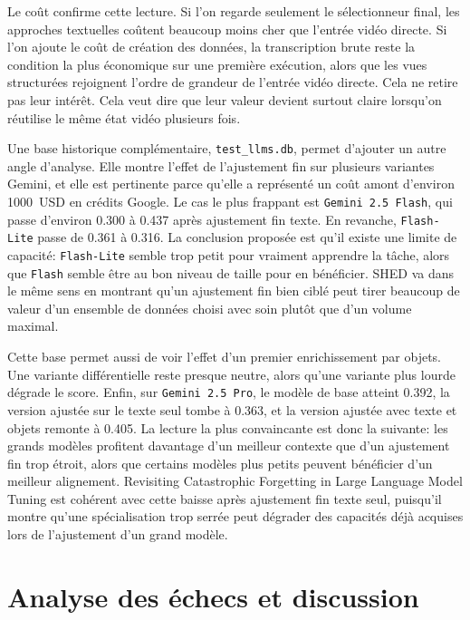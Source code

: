 Le co\^ut confirme cette lecture. Si l'on regarde seulement le s\'electionneur final, les approches textuelles co\^utent beaucoup moins cher que l'entr\'ee vid\'eo directe. Si l'on ajoute le co\^ut de cr\'eation des donn\'ees, la transcription brute reste la condition la plus \'economique sur une premi\`ere ex\'ecution, alors que les vues structur\'ees rejoignent l'ordre de grandeur de l'entr\'ee vid\'eo directe. Cela ne retire pas leur int\'er\^et. Cela veut dire que leur valeur devient surtout claire lorsqu'on r\'eutilise le m\^eme \'etat vid\'eo plusieurs fois.

Une base historique compl\'ementaire, \texttt{test\_llms.db}, permet d'ajouter un autre angle d'analyse. Elle montre l'effet de l'ajustement fin sur plusieurs variantes Gemini, et elle est pertinente parce qu'elle a repr\'esent\'e un co\^ut amont d'environ 1000~USD en cr\'edits Google. Le cas le plus frappant est \texttt{Gemini 2.5 Flash}, qui passe d'environ 0.300 \`a 0.437 apr\`es ajustement fin texte. En revanche, \texttt{Flash-Lite} passe de 0.361 \`a 0.316. La conclusion propos\'ee est qu'il existe une limite de capacit\'e: \texttt{Flash-Lite} semble trop petit pour vraiment apprendre la t\^ache, alors que \texttt{Flash} semble \^etre au bon niveau de taille pour en b\'en\'eficier. SHED \cite{he2024_shed} va dans le m\^eme sens en montrant qu'un ajustement fin bien cibl\'e peut tirer beaucoup de valeur d'un ensemble de donn\'ees choisi avec soin plut\^ot que d'un volume maximal.

Cette base permet aussi de voir l'effet d'un premier enrichissement par objets. Une variante diff\'erentielle reste presque neutre, alors qu'une variante plus lourde d\'egrade le score. Enfin, sur \texttt{Gemini 2.5 Pro}, le mod\`ele de base atteint 0.392, la version ajust\'ee sur le texte seul tombe \`a 0.363, et la version ajust\'ee avec texte et objets remonte \`a 0.405. La lecture la plus convaincante est donc la suivante: les grands mod\`eles profitent davantage d'un meilleur contexte que d'un ajustement fin trop \'etroit, alors que certains mod\`eles plus petits peuvent b\'en\'eficier d'un meilleur alignement. Revisiting Catastrophic Forgetting in Large Language Model Tuning \cite{li2024_forgetting} est coh\'erent avec cette baisse apr\`es ajustement fin texte seul, puisqu'il montre qu'une sp\'ecialisation trop serr\'ee peut d\'egrader des capacit\'es d\'ej\`a acquises lors de l'ajustement d'un grand mod\`ele.

\section{Analyse des \'echecs et discussion}

